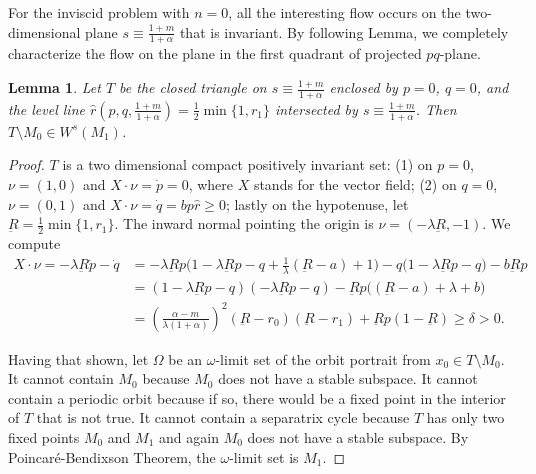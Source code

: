 \documentclass[a4paper,11pt]{article}
\newtheorem{lemma}{Lemma}[section]
\theoremstyle{remark}
\begin{document}
For the inviscid problem with $n=0$, all the interesting flow occurs on the two-dimensional plane $s\equiv \frac{1+m}{1+\alpha}$ that is invariant. By following Lemma, we completely characterize the flow on the plane in the first quadrant of projected $pq$-plane.
\begin{lemma} \label{lem:T}
 Let $T$ be the closed triangle on $s\equiv \frac{1+m}{1+\alpha}$ enclosed by $p=0$, $q=0$, and the level line $\hat{r}(p,q,\frac{1+m}{1+\alpha})= \frac{1}{2}\min\{1,r_1\}$ intersected by $s\equiv \frac{1+m}{1+\alpha}$. Then $T\setminus M_0 \in W^s(M_1)$.
\end{lemma}
\begin{proof}
$T$ is a two dimensional compact positively invariant set: (1) on $p=0$, $\nu = (1,0)$ and $X\cdot\nu = \dot{p}=0$, where $X$ stands for the vector field;
 (2) on $q=0$, $\nu = (0,1)$ and $X\cdot\nu=\dot{q} = bp\hat{r}\ge0$; lastly on the hypotenuse, let $\underbar{R}=\frac{1}{2}\min\{1,r_1\}$. The inward normal pointing the origin is $
 \nu = (-\lambda\underbar{R}, -1)$. We compute
  \begin{align}
  X\cdot\nu=-\lambda\underbar{R}\dot{p} -\dot{q}&= -\lambda \underbar{R}p \Big(1-\lambda \underbar{R}p -q + \frac{1}{\lambda}(\underbar{R}-a)+1\Big) - q(1-\lambda \underbar{R}p -q\big) - b \underbar{R}p \nonumber\\
  &= (1-\lambda \underbar{R}p -q)(-\lambda \underbar{R}p -q) -\underbar{R}p\Big((\underbar{R}-a)+\lambda+b\Big)\nonumber\\
  &= \left(\frac{\alpha-m}{\lambda(1+\alpha)}\right)^2(\underbar{R}-r_0)(\underbar{R}-r_1)+\underbar{R}p(1-\underbar{R})\ge \delta>0. \label{eq:affine}
 \end{align}

Having that shown, let $\Omega$ be an $\omega$-limit set of the orbit portrait from $x_0\in T\setminus M_0$. It cannot contain $M_0$ because $M_0$ does not have a stable subspace. It cannot contain a periodic orbit because if so, there would be a fixed point in the interior of $T$ that is not true. It cannot contain a separatrix cycle because $T$ has only two fixed points $M_0$ and $M_1$ and again $M_0$ does not have a stable subspace.  By Poincar\'e-Bendixson Theorem, the $\omega$-limit set is $M_1$.
\end{proof}
\end{document}
